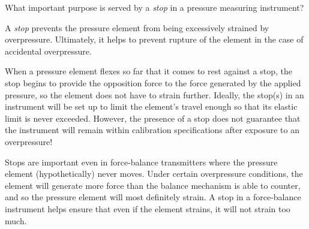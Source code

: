 What important purpose is served by a {\it stop} in a pressure measuring instrument?







A {\it stop} prevents the pressure element from being excessively strained by overpressure.  Ultimately, it helps to prevent rupture of the element in the case of accidental overpressure.

When a pressure element flexes so far that it comes to rest against a stop, the stop begins to provide the opposition force to the force generated by the applied pressure, so the element does not have to strain further.  Ideally, the stop(s) in an instrument will be set up to limit the element's travel enough so that its elastic limit is never exceeded.  However, the presence of a stop does not guarantee that the instrument will remain within calibration specifications after exposure to an overpressure!

Stops are important even in force-balance transmitters where the pressure element (hypothetically) never moves.  Under certain overpressure conditions, the element will generate more force than the balance mechanism is able to counter, and so the pressure element will most definitely strain.  A stop in a force-balance instrument helps ensure that even if the element strains, it will not strain too much.












